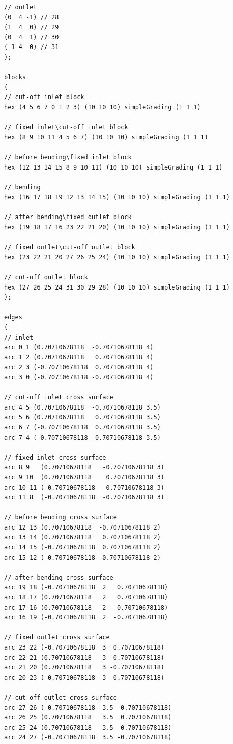\documentclass[onsided]{book}
\numberwithin{equation}{section}
\begin{document}
\begin{enumerate}
\begin{verbatim}
// outlet
(0  4 -1) // 28
(1  4  0) // 29
(0  4  1) // 30
(-1 4  0) // 31
);

blocks
(
// cut-off inlet block
hex (4 5 6 7 0 1 2 3) (10 10 10) simpleGrading (1 1 1)

// fixed inlet\cut-off inlet block
hex (8 9 10 11 4 5 6 7) (10 10 10) simpleGrading (1 1 1)

// before bending\fixed inlet block
hex (12 13 14 15 8 9 10 11) (10 10 10) simpleGrading (1 1 1)

// bending
hex (16 17 18 19 12 13 14 15) (10 10 10) simpleGrading (1 1 1)

// after bending\fixed outlet block
hex (19 18 17 16 23 22 21 20) (10 10 10) simpleGrading (1 1 1)

// fixed outlet\cut-off outlet block
hex (23 22 21 20 27 26 25 24) (10 10 10) simpleGrading (1 1 1)

// cut-off outlet block
hex (27 26 25 24 31 30 29 28) (10 10 10) simpleGrading (1 1 1)
);

edges
(
// inlet
arc 0 1 (0.70710678118  -0.70710678118 4)
arc 1 2 (0.70710678118   0.70710678118 4)
arc 2 3 (-0.70710678118  0.70710678118 4)
arc 3 0 (-0.70710678118 -0.70710678118 4)

// cut-off inlet cross surface
arc 4 5 (0.70710678118  -0.70710678118 3.5)
arc 5 6 (0.70710678118   0.70710678118 3.5)
arc 6 7 (-0.70710678118  0.70710678118 3.5)
arc 7 4 (-0.70710678118 -0.70710678118 3.5)

// fixed inlet cross surface
arc 8 9   (0.70710678118   -0.70710678118 3)
arc 9 10  (0.70710678118    0.70710678118 3)
arc 10 11 (-0.70710678118   0.70710678118 3)
arc 11 8  (-0.70710678118  -0.70710678118 3)

// before bending cross surface
arc 12 13 (0.70710678118  -0.70710678118 2)
arc 13 14 (0.70710678118   0.70710678118 2)
arc 14 15 (-0.70710678118  0.70710678118 2)
arc 15 12 (-0.70710678118 -0.70710678118 2)

// after bending cross surface
arc 19 18 (-0.70710678118  2   0.70710678118)
arc 18 17 (0.70710678118   2   0.70710678118)
arc 17 16 (0.70710678118   2  -0.70710678118)
arc 16 19 (-0.70710678118  2  -0.70710678118)

// fixed outlet cross surface
arc 23 22 (-0.70710678118  3  0.70710678118)
arc 22 21 (0.70710678118   3  0.70710678118)
arc 21 20 (0.70710678118   3 -0.70710678118)
arc 20 23 (-0.70710678118  3 -0.70710678118)

// cut-off outlet cross surface
arc 27 26 (-0.70710678118  3.5  0.70710678118)
arc 26 25 (0.70710678118   3.5  0.70710678118)
arc 25 24 (0.70710678118   3.5 -0.70710678118)
arc 24 27 (-0.70710678118  3.5 -0.70710678118)


\end{verbatim}
\end{enumerate}
\end{document}

